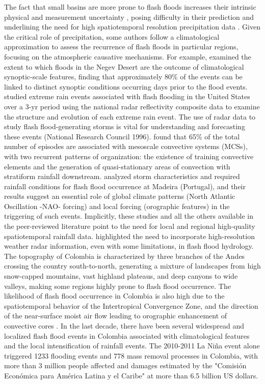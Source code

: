 \documentclass[hess, manuscript]{copernicus}
\begin{document}
The fact that small basins are more prone to flash floods increases their intrinsic physical and measurement uncertainty \citep{Wagener2007}, posing difficulty in their prediction \citep{Hardy2016, Ruiz-Villanueva2013, Yamanaka2017,Borga2011, Marra2017} and underlining the need for high spatiotemporal resolution precipitation data \citep{Norbiato2008}.  Given the critical role of precipitation, some authors follow a climatological approximation to assess the recurrence of flash floods in particular regions, focusing on the atmospheric causative mechanisms. For example, \citet{Kahana2002} examined the extent to which floods in the Negev Desert are the outcome of climatological synoptic-scale features, finding that approximately 80\% of the events can be linked to distinct synoptic conditions occurring days prior to the flood events.  \citet{Schumacher2005} studied extreme rain events associated with flash flooding in the United States over a 3-yr period using the national radar reflectivity composite data to examine the structure and evolution of each extreme rain event. The use of radar data to study flash flood-generating storms is vital for understanding and forecasting these events (National Research Council 1996). \citet{Schumacher2005} found that 65\% of the total number of episodes are associated with mesoscale convective systems (MCSs), with two recurrent patterns of organization: the existence of training convective elements and the generation of quasi-stationary areas of convection with stratiform rainfall downstream. \citet{Fragoso2012} analyzed storm characteristics and required rainfall conditions for flash flood occurrence at Madeira (Portugal), and their results suggest an essential role of global climate patterns (North Atlantic Oscillation -NAO- forcing) and local forcing (orographic features) in the triggering of such events.  Implicitly, these studies and all the others available in the peer-reviewed literature point to the need for local and regional high-quality  spatiotemporal rainfall data. \citet{BERNE2013} highlighted the need to incorporate high-resolution weather radar information, even with some limitations, in flash flood hydrology. \\


The topography of Colombia is characterized by three branches of the Andes crossing the country south-to-north, generating a mixture of landscapes from high snow-capped mountains, vast highland plateaus, and deep canyons to wide valleys, making some regions highly prone to flash flood occurrence. The likelihood of flash flood occurrence in Colombia is also high due to the spatiotemporal behavior of the Intertropical Convergence Zone, and the direction of the near-surface moist air flow leading to orographic enhancement of convective cores  \citep{Poveda2007}. In the last decade, there have been several widespread and localized flash flood events in Colombia associated with climatological features and the local intensification of rainfall events. The 2010-2011 La Niña event alone triggered 1233 flooding events and 778 mass removal processes in Colombia, with more than 3 million people affected and damages estimated by the "Comisión Económica para América Latina y el Caribe" at more than 6.5 billion US dollars.\\
\end{document}
